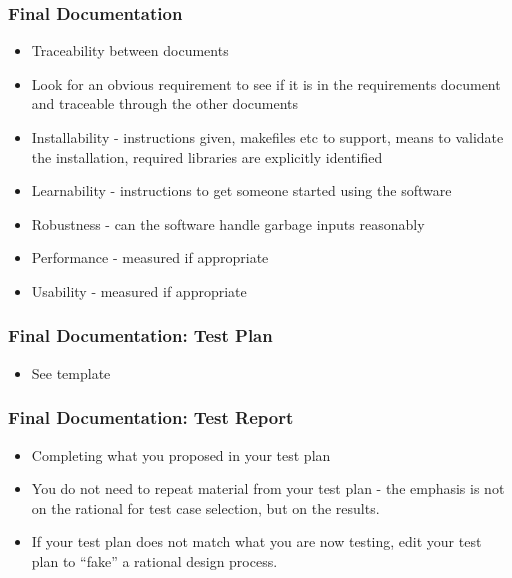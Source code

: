 \documentclass[t,12pt,numbers,fleqn]{beamer}
\begin{document}
\begin{frame}
\frametitle{Final Documentation}
\begin{itemize}
\item Traceability between documents
\item Look for an obvious requirement to see if it is in the requirements
  document and traceable through the other documents
\item Installability - instructions given, makefiles etc to support, means to
  validate the installation, required libraries are explicitly identified
\item Learnability - instructions to get someone started using the software
\item Robustness - can the software handle garbage inputs reasonably
\item Performance - measured if appropriate
\item Usability - measured if appropriate
\end{itemize}
\end{frame}


\begin{frame}
\frametitle{Final Documentation: Test Plan}
\begin{itemize}
\item See template
\end{itemize}
\end{frame}


\begin{frame}
\frametitle{Final Documentation: Test Report}
\begin{itemize}
\item Completing what you proposed in your test plan
\item You do not need to repeat material from your test plan - the emphasis is
  not on the rational for test case selection, but on the results.
\item If your test plan does not match what you are now testing, edit your test
  plan to ``fake'' a rational design process.
\end{itemize}
\end{frame}

\end{document}
